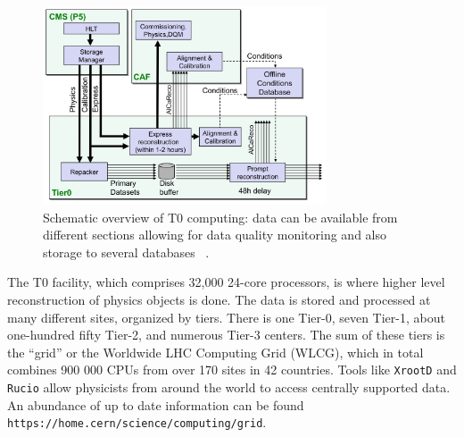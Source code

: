 \begin{figure}[ht!b]
  \centering
\includegraphics[width=0.75\textwidth]{figures/Tier0.png}    
    \caption{\label{fig:t0} Schematic overview of T0 computing: data can be available from different sections allowing for data quality monitoring and also storage to several databases ~\cite{Hufnagel:1319049}. }
\end{figure}

The T0 facility, which comprises 32,000 24-core processors, is where higher level reconstruction of physics objects is done.  
The data is stored and processed at many different sites, organized by tiers. There is one Tier-0, seven Tier-1, about one-hundred fifty Tier-2, and numerous Tier-3 centers. The sum of these tiers is the ``grid'' or the Worldwide LHC Computing Grid (WLCG), which in total combines 900 000 CPUs from over 170 sites in 42 countries. Tools like \texttt{XrootD} and \texttt{Rucio} allow physicists from around the world to access centrally supported data. An abundance of up to date information can be found \texttt{https://home.cern/science/computing/grid}. 



